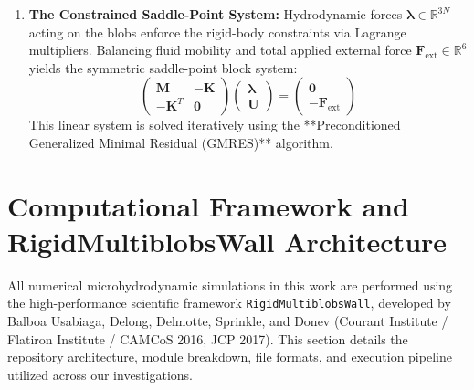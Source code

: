 \documentclass[11pt,a4paper]{article}
\begin{document}
\begin{enumerate}
    \item \textbf{The Constrained Saddle-Point System:} Hydrodynamic forces $\boldsymbol{\lambda} \in \mathbb{R}^{3N}$ acting on the blobs enforce the rigid-body constraints via Lagrange multipliers. Balancing fluid mobility and total applied external force $\mathbf{F}_{\text{ext}} \in \mathbb{R}^6$ yields the symmetric saddle-point block system:
    \begin{equation}
        \begin{pmatrix} \mathbf{M} & -\mathbf{K} \\ -\mathbf{K}^T & \mathbf{0} \end{pmatrix} \begin{pmatrix} \boldsymbol{\lambda} \\ \mathbf{U} \end{pmatrix} = \begin{pmatrix} \mathbf{0} \\ -\mathbf{F}_{\text{ext}} \end{pmatrix} \label{eq:saddle_point}
    \end{equation}
    This linear system is solved iteratively using the **Preconditioned Generalized Minimal Residual (GMRES)** algorithm.
\end{enumerate}

\section{Computational Framework and RigidMultiblobsWall Architecture}

All numerical microhydrodynamic simulations in this work are performed using the high-performance scientific framework \texttt{RigidMultiblobsWall}, developed by Balboa Usabiaga, Delong, Delmotte, Sprinkle, and Donev (Courant Institute / Flatiron Institute / CAMCoS 2016, JCP 2017). This section details the repository architecture, module breakdown, file formats, and execution pipeline utilized across our investigations.
\end{document}
